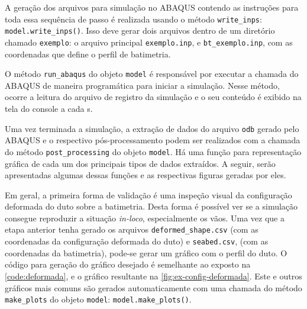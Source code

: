 
A geração dos arquivos para simulação no ABAQUS contendo as instruções para toda essa sequência de passo é realizada usando o método \texttt{write\_inps}: \texttt{model.write\_inps()}.
Isso deve gerar dois arquivos dentro de um diretório chamado \texttt{exemplo}: o arquivo principal \texttt{exemplo.inp}, e \texttt{bt\_exemplo.inp}, com as coordenadas que define o perfil de batimetria. \par

O método \texttt{run\_abaqus} do objeto \texttt{model} é responsável por executar a chamada do ABAQUS de maneira programática para iniciar a simulação.
Nesse método, ocorre a leitura do arquivo de registro da simulação e o seu conteúdo é exibido na tela do console a cada \unit[5]{s}.

Uma vez terminada a simulação, a extração de dados do arquivo \texttt{odb} gerado pelo ABAQUS e o respectivo pós-processamento podem ser realizados com a chamada do método \texttt{post\_processing} do objeto \texttt{model}.
Há uma função para representação gráfica de cada um dos principais tipos de dados extraídos. A seguir, serão apresentadas algumas dessas funções e as respectivas figuras geradas por eles.

Em geral, a primeira forma de validação é uma inspeção visual da configuração deformada do duto sobre a batimetria. Desta forma é possível ver se a simulação consegue reproduzir a situação \textit{in-loco}, especialmente os vãos. Uma vez que a etapa anterior tenha gerado os arquivos \texttt{deformed\_shape.csv} (com as coordenadas da configuração deformada do duto) e \texttt{seabed.csv}, (com as coordenadas da batimetria), pode-se gerar um gráfico com o perfil do duto. O código para geração do gráfico desejado é semelhante ao exposto na \autoref{code:deformada}, e o gráfico resultante na \autoref{fig:ex-config-deformada}. Este e outros gráficos mais comuns são gerados automaticamente com uma chamada do método \texttt{make\_plots} do objeto \texttt{model}: \texttt{model.make\_plots()}.

